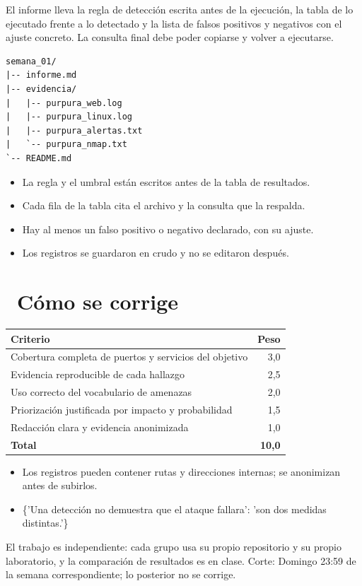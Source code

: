 \documentclass[11pt,a4paper]{article}
\newcommand{\iconotexto}[2]{\textcolor{cyanNeon}{\faIcon{#1}}~#2}
\begin{document}
El informe lleva la regla de detección escrita antes de la ejecución, la tabla de lo ejecutado frente a lo detectado y la lista de falsos positivos y negativos con el ajuste concreto. La consulta final debe poder copiarse y volver a ejecutarse.

\begin{lstlisting}[style=estiloCodigo]
semana_01/
|-- informe.md
|-- evidencia/
|   |-- purpura_web.log
|   |-- purpura_linux.log
|   |-- purpura_alertas.txt
|   `-- purpura_nmap.txt
`-- README.md
\end{lstlisting}

\begin{itemize}[leftmargin=1.4em,itemsep=2pt,topsep=3pt]
  \item La regla y el umbral están escritos antes de la tabla de resultados.
  \item Cada fila de la tabla cita el archivo y la consulta que la respalda.
  \item Hay al menos un falso positivo o negativo declarado, con su ajuste.
  \item Los registros se guardaron en crudo y no se editaron después.
\end{itemize}

\section{\iconotexto{ruler-combined}{Cómo se corrige}}

\begin{tabularx}{\linewidth}{@{}X r@{}}
\toprule
Criterio & Peso\\
\midrule
Cobertura completa de puertos y servicios del objetivo & 3,0 \\
Evidencia reproducible de cada hallazgo & 2,5 \\
Uso correcto del vocabulario de amenazas & 2,0 \\
Priorización justificada por impacto y probabilidad & 1,5 \\
Redacción clara y evidencia anonimizada & 1,0 \\
\midrule
\textbf{Total} & \textbf{10,0}\\
\bottomrule
\end{tabularx}

\begin{itemize}[leftmargin=1.4em,itemsep=2pt,topsep=3pt]
  \item Los registros pueden contener rutas y direcciones internas; se anonimizan antes de subirlos.
  \item \{'Una detección no demuestra que el ataque fallara': 'son dos medidas distintas.'\}
\end{itemize}

\begin{cajaRecuerda}El trabajo es independiente: cada grupo usa su propio repositorio y su propio laboratorio, y la comparación de resultados es en clase. Corte: Domingo 23:59 de la semana correspondiente; lo posterior no se corrige.
\end{cajaRecuerda}
\end{document}
